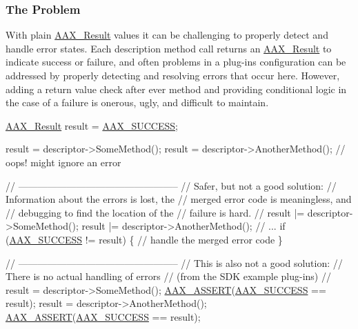 \hypertarget{a00326_describe_checking_results_problem}{}\subsubsection{The Problem}\label{a00326_describe_checking_results_problem}
 With plain \hyperlink{a00149_a4d8f69a697df7f70c3a8e9b8ee130d2f}{A\+A\+X\+\_\+\+Result} values it can be challenging to properly detect and handle error states. Each description method call returns an \hyperlink{a00149_a4d8f69a697df7f70c3a8e9b8ee130d2f}{A\+A\+X\+\_\+\+Result} to indicate success or failure, and often problems in a plug-\/in\textquotesingle{}s configuration can be addressed by properly detecting and resolving errors that occur here. However, adding a return value check after ever method and providing conditional logic in the case of a failure is onerous, ugly, and difficult to maintain.


\begin{DoxyCode}
\hyperlink{a00149_a4d8f69a697df7f70c3a8e9b8ee130d2f}{AAX\_Result} result = \hyperlink{a00207_a5f8c7439f3a706c4f8315a9609811937aeddbd1bb67e3a66e6af54a4b4a7a57b3}{AAX\_SUCCESS};

result = descriptor->SomeMethod();
result = descriptor->AnotherMethod(); \textcolor{comment}{// oops! might ignore an error}
\end{DoxyCode}



\begin{DoxyCode}
\textcolor{comment}{// --------------------------------------------------}
\textcolor{comment}{// Safer, but not a good solution:}
\textcolor{comment}{// Information about the errors is lost, the}
\textcolor{comment}{// merged error code is meaningless, and}
\textcolor{comment}{// debugging to find the location of the}
\textcolor{comment}{// failure is hard.}
\textcolor{comment}{//}
result |= descriptor->SomeMethod();
result |= descriptor->AnotherMethod();
\textcolor{comment}{// ...}
\textcolor{keywordflow}{if} (\hyperlink{a00207_a5f8c7439f3a706c4f8315a9609811937aeddbd1bb67e3a66e6af54a4b4a7a57b3}{AAX\_SUCCESS} != result)
\{
  \textcolor{comment}{// handle the merged error code}
\}
\end{DoxyCode}



\begin{DoxyCode}
\textcolor{comment}{// --------------------------------------------------}
\textcolor{comment}{// This is also not a good solution:}
\textcolor{comment}{// There is no actual handling of errors}
\textcolor{comment}{// (from the SDK example plug-ins)}
\textcolor{comment}{//}
result = descriptor->SomeMethod();
\hyperlink{a00158_a168ee44fd7a5485ab50160db36fb2988}{AAX\_ASSERT}(\hyperlink{a00207_a5f8c7439f3a706c4f8315a9609811937aeddbd1bb67e3a66e6af54a4b4a7a57b3}{AAX\_SUCCESS} == result);
result = descriptor->AnotherMethod();
\hyperlink{a00158_a168ee44fd7a5485ab50160db36fb2988}{AAX\_ASSERT}(\hyperlink{a00207_a5f8c7439f3a706c4f8315a9609811937aeddbd1bb67e3a66e6af54a4b4a7a57b3}{AAX\_SUCCESS} == result);
\end{DoxyCode}



